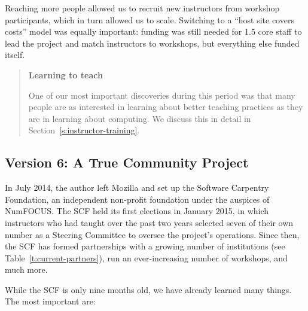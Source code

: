 \documentclass[10pt,a4paper,twocolumn]{article}
\begin{document}
Reaching more people allowed us to recruit new instructors from
workshop participants, which in turn allowed us to scale. Switching to
a ``host site covers costs'' model was equally important: funding was
still needed for 1.5 core staff to lead the project and match
instructors to workshops, but everything else funded itself.

\begin{quote}
\textbf{Learning to teach}

One of our most important discoveries during this period was that many
people are as interested in learning about better teaching practices
as they are in learning about computing.  We discuss this in detail in
Section~\ref{s:instructor-training}.

\end{quote}

\subsection{Version 6: A True Community Project}\label{s:community}

In July 2014, the author left Mozilla and set up the Software
Carpentry Foundation, an independent non-profit foundation under the
auspices of NumFOCUS.  The SCF held its first elections in January
2015, in which instructors who had taught over the past two years
selected seven of their own number as a Steering Committee to oversee
the project's operations.  Since then, the SCF has formed partnerships
with a growing number of institutions (see
Table~\ref{t:current-partners}), run an ever-increasing number of
workshops, and much more.

While the SCF is only nine months old, we have already learned many
things.  The most important are:
\end{document}
